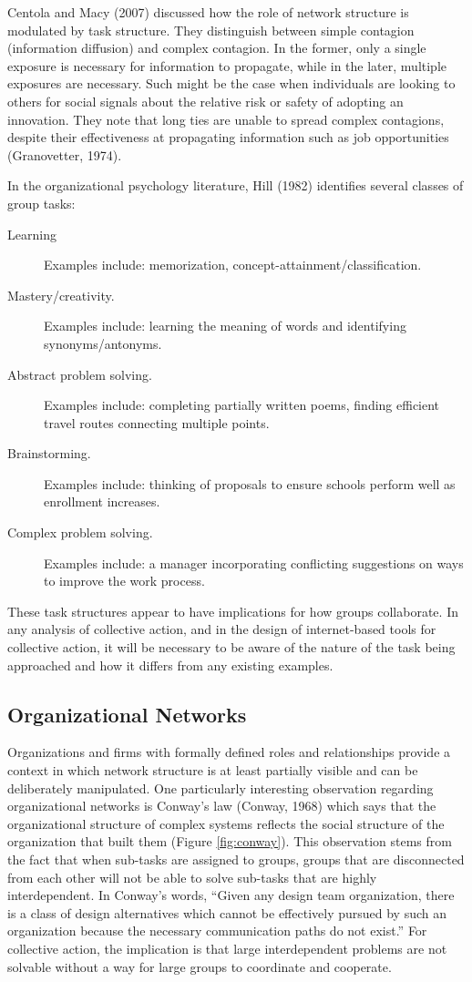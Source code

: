 Centola and Macy (2007) discussed how the role of network structure is modulated by task structure. They distinguish between simple contagion (information diffusion) and complex contagion. In the former, only a single exposure is necessary for information to propagate, while in the later, multiple exposures are necessary. Such might be the case when individuals are looking to others for social signals about the relative risk or safety of adopting an innovation. They note that long ties are unable to spread complex contagions, despite their effectiveness at propagating information such as job opportunities (Granovetter, 1974).

In the organizational psychology literature, Hill (1982) identifies several classes of group tasks:

\begin{description}
\item[Learning]{Examples include: memorization, concept-attainment/classification.}
\item[Mastery/creativity.]{Examples include: learning the meaning of words and identifying synonyms/antonyms.}
\item[Abstract problem solving.]{Examples include: completing partially written poems, finding efficient travel routes connecting multiple points.}
\item[Brainstorming.]{Examples include: thinking of proposals to ensure schools perform well as enrollment increases.}
\item[Complex problem solving.]{Examples include: a manager incorporating conflicting suggestions on ways to improve the work process.}
\end{description}

These task structures appear to have implications for how groups collaborate. In any analysis of collective action, and in the design of internet-based tools for collective action, it will be necessary to be aware of the nature of the task being approached and how it differs from any existing examples.

\subsection{Organizational Networks}
Organizations and firms with formally defined roles and relationships provide a context in which network structure is at least partially visible and can be deliberately manipulated. One particularly interesting observation regarding organizational networks is Conway's law (Conway, 1968) which says that the organizational structure of complex systems reflects the social structure of the organization that built them (Figure \ref{fig:conway}). This observation stems from the fact that when sub-tasks are assigned to groups, groups that are disconnected from each other will not be able to solve sub-tasks that are highly interdependent. In Conway's words, ``Given any design team organization, there is a class of design alternatives which cannot be effectively pursued by such an organization because the necessary communication paths do not exist.'' For collective action, the implication is that large interdependent problems are not solvable without a way for large groups to coordinate and cooperate.


